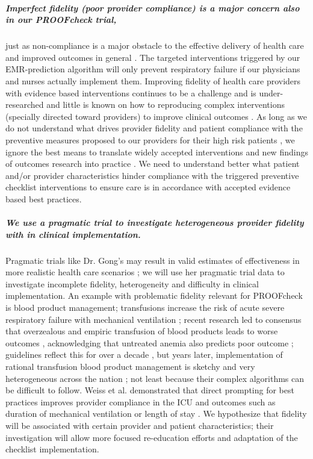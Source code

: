 \documentclass[11pt,notitlepage]{article}
\begin{document}
\subparagraph*{Imperfect fidelity (poor provider compliance) is a major concern also in our PROOFcheck trial,} just as non-compliance is a major obstacle to the effective delivery of health care and improved outcomes in general
\cite{Duncan_16710766}. The targeted interventions triggered by our EMR-prediction algorithm will only prevent respiratory failure if our physicians and nurses actually implement them. Improving fidelity of health care providers with evidence based interventions continues to be a challenge and is under-researched \cite{Davis_7650822} and little is known on how to reproducing complex interventions (specially directed toward providers) to improve clinical outcomes \cite{Campbell_10987780}. As long as we do not understand what drives provider fidelity and patient compliance with the preventive measures proposed to our providers for their high risk patients  \cite{Mittman_15172904}, we ignore the best means to translate widely accepted interventions and new findings of outcomes research into practice \cite{Glasgow_17150029}. We need to understand better what patient and/or provider characteristics hinder compliance with the triggered preventive checklist interventions to ensure care is in accordance with accepted evidence based best practices.

\subparagraph*{We use a pragmatic trial to investigate heterogeneous provider fidelity with in clinical implementation.} Pragmatic trials like Dr. Gong's may result in valid estimates of effectiveness in more realistic health care scenarios \cite{Selby_22824225,Tosh_21842618}; we will use her pragmatic trial data to investigate incomplete fidelity, heterogeneity and difficulty in clinical implementation. An example with problematic fidelity relevant for PROOFcheck is blood product management; transfusions increase the risk of acute severe respiratory failure with mechanical ventilation \cite{Kenz_24892308};  recent research led to consensus that overzealous and empiric transfusion of blood products leads to worse outcomes \cite{Hebert_9971864}, acknowledging that untreated anemia also predicts poor outcome \cite{Ranucci_22698773}; guidelines reflect this for over a decade \cite{ASA_25545654}, but  years later, implementation of rational transfusion blood product management is sketchy and very heterogeneous across the nation \cite{Likosky_20488928}; not least because their complex algorithms can be difficult to follow. Weiss et al. demonstrated that direct prompting for best practices improves provider compliance in the ICU and outcomes such as duration of mechanical ventilation or length of stay \cite{Weiss_21616996}. We hypothesize that fidelity will be associated with certain provider and patient characteristics; their investigation will allow more focused re-education efforts and adaptation of the checklist implementation. 
\end{document}
